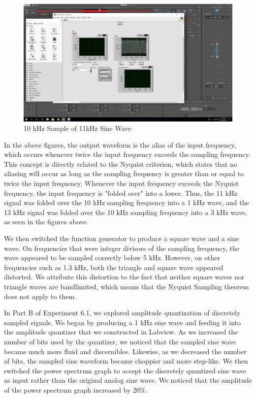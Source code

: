 \documentclass[10pt]{article}
\begin{document}
\begin{centering}
	\begin{figure} [H]
		\centering
		\includegraphics[scale=0.22]{images/51a13000input3000measured.PNG}
		\caption{10 kHz Sample of 11kHz Sine Wave}
		\label{fig:13khz}
	\end{figure}
\end{centering}

In the above figures, the output waveform is the alias of the input frequency, which occurs whenever twice the input frequency exceeds the sampling frequency. This concept is directly related to the Nyquist criterion, which states that no aliasing will occur as long as the sampling frequency is greater than or equal to twice the input frequency. Whenever the input frequency exceeds the Nyquist frequency, the input frequency is "folded over" into a lower. Thus, the 11 kHz signal was folded over the 10 kHz sampling frequency into a 1 kHz wave, and the 13 kHz signal was folded over the 10 kHz sampling frequency into a 3 kHz wave, as seen in the figures above. 

We then switched the function generator to produce a square wave and a sine wave. On frequencies that were integer divisors of the sampling frequency, the wave appeared to be sampled correctly below 5 kHz. However, on other frequencies such as 1.3 kHz, both the triangle and square wave appeared distorted. We attribute this distortion to the fact that neither square waves nor triangle waves are bandlimited, which means that the Nyquist Sampling theorem does not apply to them.


In Part B of Experiment 6.1, we explored amplitude quantization of discretely sampled signals. We began by producing a 1 kHz sine wave and feeding it into the amplitude quantizer that we constructed in Labview. As we increased the number of bits used by the quantizer, we noticed that the sampled sine wave became much more fluid and discerniblee. Likewise, as we decreased the number of bits, the sampled sine waveform became choppier and more step-like. We then switched the power spectrum graph to accept the discretely quantized sine wave as input rather than the original analog sine wave. We noticed that the amplitude of the power spectrum graph increased by 20\%. 
\end{document}
